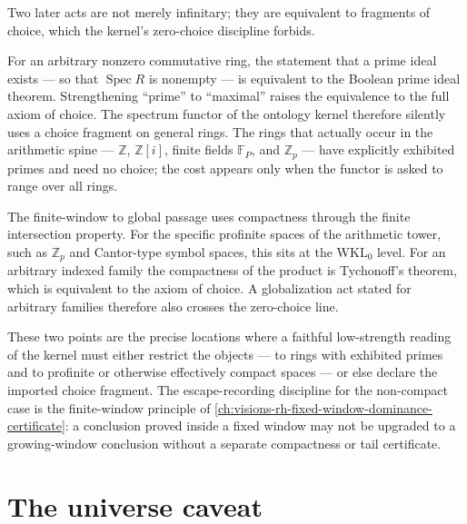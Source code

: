 Two later acts are not merely infinitary; they are equivalent to fragments of
choice, which the kernel's zero-choice discipline forbids.

\begin{principle}
\label{prin:ontology-kernel-spectrum-choice}
For an arbitrary nonzero commutative ring, the statement that a prime ideal
exists --- so that $\operatorname{Spec}R$ is nonempty --- is equivalent to the
Boolean prime ideal theorem.  Strengthening ``prime'' to ``maximal'' raises the
equivalence to the full axiom of choice.  The spectrum functor of the ontology
kernel therefore silently uses a choice fragment on general rings.  The rings
that actually occur in the arithmetic spine --- $\mathbb Z$, $\mathbb Z[i]$,
finite fields $\mathbb F_P$, and $\mathbb Z_p$ --- have explicitly exhibited
primes and need no choice; the cost appears only when the functor is asked to
range over all rings.
\end{principle}

\begin{principle}
\label{prin:ontology-kernel-global-compactness}
The finite-window to global passage uses compactness through the finite
intersection property.  For the specific profinite spaces of the arithmetic
tower, such as $\mathbb Z_p$ and Cantor-type symbol spaces, this sits at the
$\mathrm{WKL}_0$ level.  For an arbitrary indexed family the compactness of the
product is Tychonoff's theorem, which is equivalent to the axiom of choice.  A
globalization act stated for arbitrary families therefore also crosses the
zero-choice line.
\end{principle}

These two points are the precise locations where a faithful low-strength reading
of the kernel must either restrict the objects --- to rings with exhibited
primes and to profinite or otherwise effectively compact spaces --- or else
declare the imported choice fragment.  The escape-recording discipline for the
non-compact case is the finite-window principle of
\autoref{ch:visions-rh-fixed-window-dominance-certificate}: a conclusion proved
inside a fixed window may not be upgraded to a growing-window conclusion without
a separate compactness or tail certificate.

\section{The universe caveat}
\label{sec:ontology-kernel-universe-caveat}

